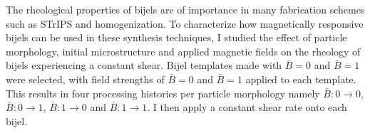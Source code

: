 
The rheological properties of bijels are of importance in many fabrication schemes such as STrIPS and homogenization. \cite{haase_continuous_2015,cai_bijels_2017}
To characterize how magnetically responsive bijels can be used in these synthesis techniques, I studied the effect of particle morphology, initial microstructure and
applied magnetic fields on the rheology of bijels experiencing a constant shear. Bijel templates made with $\bar{B} = 0$ and $\bar{B} = 1$ were selected, with field strengths
of $\bar{B} = 0$ and $\bar{B} = 1$ applied to each template. This results in four processing histories per particle morphology namely $\bar{B}:0 \rightarrow 0$,
$\bar{B}:0 \rightarrow 1$, $\bar{B}:1 \rightarrow 0$ and $\bar{B}:1 \rightarrow 1$. I then apply a constant shear rate onto each bijel.

